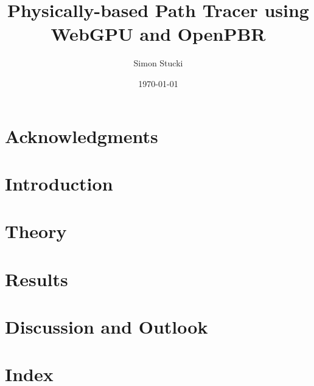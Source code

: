 \documentclass[a4paper, 11pt,abstract=on, listof=totocnumbered]{scrreprt}
\title{Physically-based Path Tracer using WebGPU and OpenPBR}
\author{Simon Stucki}
\date{\today}
\begin{document}
% 

\clearpage
\setcounter{page}{1}


\begin{abstract}

\end{abstract}

\chapter*{Acknowledgments}


\renewcommand{\contentsname}{Contents}
\tableofcontents

\chapter{Introduction}


\chapter{Theory}


\chapter{Results}


\chapter{Discussion and Outlook}


\chapter{Index}


%
\end{document}
